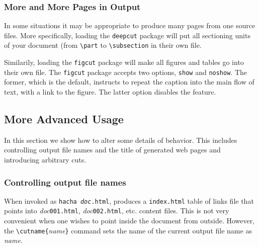 \subsubsection{More and More Pages in Output}
%
In some situations it may be appropriate to produce many
pages from one source files.
More specifically, loading the \texttt{deepcut} package will put
all sectioning units of your document (from \verb+\part+ to
\verb+\subsection+ in their own file.

Similarily, loading the \texttt{figcut} package will make all figures
and tables go into their own file.
The \texttt{figcut} package accepts two options, \texttt{show} and
\texttt{noshow}. The former, which is the default, instructs \hevea{}
to repeat the caption into the main flow of text, with a link to the figure.
The latter option disables the feature.


\subsection{More Advanced Usage}
In this section we show how to alter some details of \hacha{}
behavior.
This includes controlling output file names and the title of generated
web pages and introducing arbitrary cuts.

\subsubsection{Controlling output file names}\label{cutname}
When invoked as \texttt{hacha \textit{doc}.html},
\hacha{} produces a \texttt{index.html} table of links file that
points into \textit{doc}\texttt{001.html},
\textit{doc}\texttt{002.html}, etc. content files.
This is not very convenient when one wishes to point inside the
document from outside.
However, the \verb+\cutname{+\textit{name}\verb+}+ command
sets the name of  the current output file name as \textit{name}.

